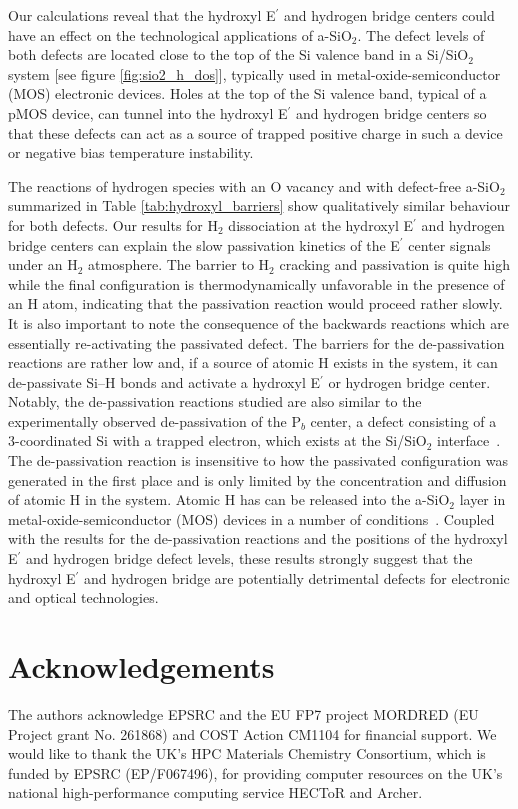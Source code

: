 \documentclass[aps,prb,reprint,superscriptaddress,showpacs]{revtex4-1}
\begin{document}
Our calculations reveal that the hydroxyl E$^\prime$ and hydrogen bridge centers could have an effect on the technological applications of a-SiO$_2$. The defect levels of both defects are located close to the top of the Si valence band in a Si/SiO$_2$ system [see figure \ref{fig:sio2_h_dos}], typically used in metal-oxide-semiconductor (MOS) electronic devices. Holes at the top of the Si valence band, typical of a pMOS device, can tunnel into the hydroxyl E$^\prime$ and hydrogen bridge centers so that these defects can act as a source of trapped positive charge in such a device or negative bias temperature instability.

The reactions of hydrogen species with an O vacancy and with defect-free a-SiO$_2$ summarized in Table \ref{tab:hydroxyl_barriers} show qualitatively similar behaviour for both defects. Our results for H$_2$ dissociation at the hydroxyl E$^\prime$ and hydrogen bridge centers can explain the slow passivation kinetics of the E$^\prime$ center signals under an H$_2$ atmosphere. The barrier to H$_2$ cracking and passivation is quite high while the final configuration is thermodynamically unfavorable in the presence of an H atom, indicating that the passivation reaction would proceed rather slowly. It is also important to note the consequence of the backwards reactions which are essentially re-activating the passivated defect. The barriers for the de-passivation reactions are rather low and, if a source of atomic H exists in the system, it can de-passivate \mbox{Si--H} bonds and activate a hydroxyl E$^\prime$ or hydrogen bridge center. Notably, the de-passivation reactions studied are also similar to the experimentally observed de-passivation of the P$_b$ center, a defect consisting of a 3-coordinated Si with a trapped electron, which exists at the Si/SiO$_2$ interface~\cite{cartier_depassivation}. The de-passivation reaction is insensitive to how the passivated configuration was generated in the first place and is only limited by the concentration and diffusion of atomic H in the system. Atomic H has can be released into the a-SiO$_2$ layer in metal-oxide-semiconductor (MOS) devices in a number of conditions~\cite{h_gate1,h_gate2,poindexter_hydrogenous}. Coupled with the results for the de-passivation reactions and the positions of the hydroxyl E$^\prime$ and hydrogen bridge defect levels, these results strongly suggest that the hydroxyl E$^\prime$ and hydrogen bridge are potentially detrimental defects for electronic and optical technologies.

\section{Acknowledgements}
The authors acknowledge EPSRC and the EU FP7 project MORDRED (EU Project grant No. 261868) and COST Action CM1104 for financial support. We would like to thank the UK's HPC Materials Chemistry Consortium, which is funded by EPSRC (EP/F067496), for providing computer resources on the UK's national high-performance computing service HECToR and Archer. 


\end{document}
